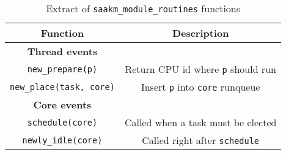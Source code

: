 \begin{table}[htbp]
        \caption{Extract of \texttt{saakm\_module\_routines} functions}
        \begin{tabular}{|c|c|}
        \hline
        \textbf{Function} & \textbf{Description} \\
        \hline
                \textbf{Thread events} & \\
                \hline
                \texttt{new\_prepare(p)} & Return CPU id where \texttt{p} should run\\
                \texttt{new\_place(task, core)} & Insert \texttt{p} into \texttt{core} runqueue\\
        
                \hline
                \textbf{Core events} & \\
                \hline
                \texttt{schedule(core)} & Called when a task must be elected\\
                \texttt{newly\_idle(core)} & Called right after \texttt{schedule}\\
        \hline
        \end{tabular}
        
\label{tab:saakm-callbacks}
\end{table}

